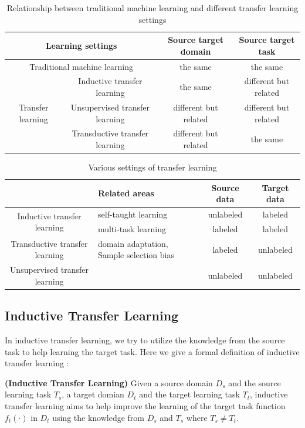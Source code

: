 \begin{table}[htbp]
	\centering
	\caption{Relationship between traditional machine learning and different transfer learning settings}
	\begin{tabular}{|c|c|c|c|}
		\hline
		\multicolumn{2}{|c|}{Learning settings} & Source target domain & Source target task \\
		\hline
		\multicolumn{2}{|c|}{Traditional machine learning} & the same & the same \\\hline
		\multirow{3}{*}{Transfer learning} & Inductive transfer learning & the same & different but related \\\cline{2-4}
		& Unsupervised transfer learning & different but related & different but related \\\cline{2-4}
		& Transductive transfer learning & different but related & the same \\\hline	
	\end{tabular}%
	\label{tab:related:transfercmp}%
\end{table}%

\begin{table}[htbp]
	\centering
	\caption{Various settings of transfer learning}
	\begin{tabular}{|c|C{4cm}|c|c|}
		\hline
		& Related areas & Source data & Target data \\
		\hline
		[4]{*}{Inductive transfer learning} & self-taught learning & unlabeled & labeled \\
		& multi-task learning & labeled & labeled \\\hline
		 Transductive transfer learning& domain adaptation, Sample selection bias & labeled & unlabeled \\\hline
		Unsupervised transfer learning &       & unlabeled & unlabeled \\
		\hline
	\end{tabular}%
	\label{tab:related:transfersetting}%
\end{table}%
\subsection{Inductive Transfer Learning}
In inductive transfer learning, we try to utilize the knowledge from the source task to help learning the target task. Here we give a formal definition of inductive transfer learning \cite{pan2010survey}:
\begin{definition}{\textbf{(Inductive Transfer Learning)}}
	Given a source domain $D_s$ and the source learning task $T_s$, a target domian $D_t$ and the target learning task $T_t$, inductive transfer learning aims to help improve the learning of the target task function $f_t(\cdot)$ in $D_t$ using the knowledge from $D_s$ and $T_s$ where $T_s \neq T_t$.
\end{definition}


